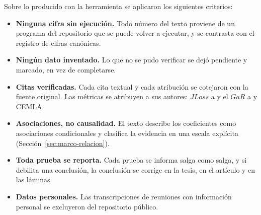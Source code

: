 Sobre lo producido con la herramienta se aplicaron los siguientes criterios:
\begin{itemize}
    \item \textbf{Ninguna cifra sin ejecución.} Todo número del texto proviene de un programa del repositorio que se puede volver a ejecutar, y se contrasta con el registro de cifras canónicas.
    \item \textbf{Ningún dato inventado.} Lo que no se pudo verificar se dejó pendiente y marcado, en vez de completarse.
    \item \textbf{Citas verificadas.} Cada cita textual y cada atribución se cotejaron con la fuente original. Las métricas se atribuyen a sus autores: $JLoss$ a \citet{Chari2024b} y el $GaR$ a \citet{ABG2019b} y CEMLA.
    \item \textbf{Asociaciones, no causalidad.} El texto describe los coeficientes como asociaciones condicionales y clasifica la evidencia en una escala explícita (Sección~\ref{sec:marco-relacion}).
    \item \textbf{Toda prueba se reporta.} Cada prueba se informa salga como salga, y si debilita una conclusión, la conclusión se corrige en la tesis, en el artículo y en las láminas.
    \item \textbf{Datos personales.} Las transcripciones de reuniones con información personal se excluyeron del repositorio público.
\end{itemize}

